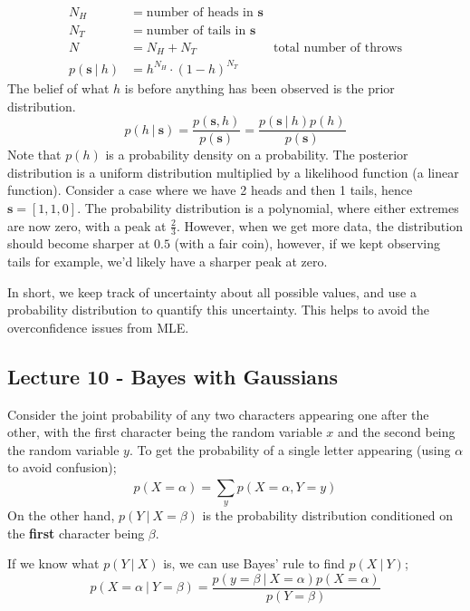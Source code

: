 \documentclass[a4paper, 12pt]{article}
\newcommand{\summation}[2]{\sum\limits_{#1}^{#2}}
\renewcommand{\vec}[1]{\boldsymbol{#1}}
\begin{document}
                \begin{align*}
                    N_H & = \text{number of heads in $\vec{s}$} \\
                    N_T & = \text{number of tails in $\vec{s}$} \\
                    N & = N_H + N_T & \text{total number of throws} \\
                    p(\vec{s}\ |\ h) & = h^{N_H} \cdot (1 - h)^{N_T}
                \end{align*}
                The belief of what $h$ is before anything has been observed is the prior distribution.
                $$p(h\ |\ \vec{s}) = \frac{p(\vec{s}, h)}{p(\vec{s})} = \frac{p(\vec{s}\ |\ h)p(h)}{p(\vec{s})}$$
                Note that $p(h)$ is a probability density on a probability.
                The posterior distribution is a uniform distribution multiplied by a likelihood function (a linear function).
                Consider a case where we have 2 heads and then 1 tails, hence $\vec{s} = [1, 1, 0]$.
                The probability distribution is a polynomial, where either extremes are now zero, with a peak at $\frac{2}{3}$.
                However, when we get more data, the distribution should become sharper at $0.5$ (with a fair coin), however, if we kept observing tails for example, we'd likely have a sharper peak at zero.
                \medskip

                In short, we keep track of uncertainty about all possible values, and use a probability distribution to quantify this uncertainty.
                This helps to avoid the overconfidence issues from MLE.
        \subsection*{Lecture 10 - Bayes with Gaussians}
            Consider the joint probability of any two characters appearing one after the other, with the first character being the random variable $x$ and the second being the random variable $y$.
            To get the probability of a single letter appearing (using $\alpha$ to avoid confusion);
            $$p(X = \alpha) = \summation{y}{} p(X = \alpha, Y = y)$$
            On the other hand, $p(Y\ |\ X = \beta)$ is the probability distribution conditioned on the \textbf{first} character being $\beta$.
            \medskip

            If we know what $p(Y\ |\ X)$ is, we can use Bayes' rule to find $p(X\ |\ Y)$;
            $$p(X = \alpha\ |\ Y = \beta) = \frac{p(y = \beta\ |\ X = \alpha)p(X = \alpha)}{p(Y = \beta)}$$
\end{document}

